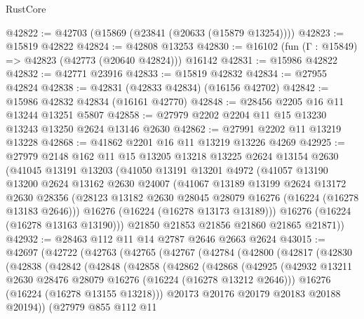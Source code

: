 \begin{lexlean}{RustCore}
\begin{coremodule}
@42822 := @42703 (@15869 (@23841 (@20633 (@15879 @13254))))
@42823 := @15819 @42822
@42824 := @42808 @13253
@42830 := @16102 (fun (Γ : @15849) => @42823 (@42773 (@20640 @42824))) @16142
@42831 := @15986 @42822
@42832 := @42771 @23916
@42833 := @15819 @42832
@42834 := @27955 @42824
@42838 := @42831 (@42833 @42834) (@16156 @42702)
@42842 := @15986 @42832 @42834 (@16161 @42770)
@42848 := @28456 @2205 @16 @11 @13244 @13251 @5807
@42858 := @27979 @2202 @2204 @11 @15 @13230 @13243 @13250 @2624 @13146 @2630
@42862 := @27991 @2202 @11 @13219 @13228
@42868 := @41862 @2201 @16 @11 @13219 @13226 @4269
@42925 := @27979
    @2148
    @162
    @11
    @15
    @13205
    @13218
    @13225
    @2624
    @13154
    @2630
    (@41045
      @13191
      @13203
      (@41050
        @13191
        @13201
        @4972
        (@41057
          @13190
          @13200
          @2624
          @13162
          @2630
          @24007
          (@41067
            @13189
            @13199
            @2624
            @13172
            @2630
            @28356
            (@28123 @13182 @2630 @28045 @28079 @16276 (@16224 (@16278 @13183 @2646)))
            @16276
            (@16224 (@16278 @13173 @13189)))
          @16276
          (@16224 (@16278 @13163 @13190)))
        @21850
        @21853
        @21856
        @21860
        @21865
        @21871))
@42932 := @28463 @112 @11 @14 @2787 @2646 @2663 @2624
@43015 := @42697
    (@42722
      (@42763
        (@42765
          (@42767
            (@42784
              (@42800
                (@42817
                  (@42830
                    (@42838
                      (@42842
                        (@42848
                          (@42858
                            (@42862
                              (@42868
                                (@42925
                                  (@42932
                                    @13211
                                    @2630
                                    @28476
                                    @28079
                                    @16276
                                    (@16224 (@16278 @13212 @2646)))
                                  @16276
                                  (@16224 (@16278 @13155 @13218)))
                                @20173
                                @20176
                                @20179
                                @20183
                                @20188
                                @20194))
                            (@27979
                              @855
                              @112
                              @11

\end{coremodule}
\end{lexlean}

